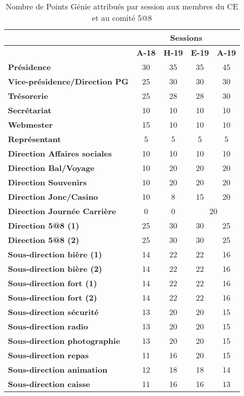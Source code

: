 \begin{table}[H]
    \centering
    \caption{Nombre de Points Génie attribués par session aux membres du CE et au comité 5@8}
    \begin{tabular}{|l|c|c|c|c|}
      \hline
       &\multicolumn{4}{|c|}{\textbf{Sessions}} \\ 
      \hline
       & \textbf{A-18} & \textbf{H-19} & \textbf{E-19} & \textbf{A-19} \\
      \hline
      \textbf{Présidence} & 30 & 35 & 35 & 45 \\
      \hline
      \textbf{Vice-présidence/Direction PG} & 25 & 30 & 30 & 30\\
      \hline
      \textbf{Trésorerie} & 25 & 28 & 28 & 30 \\
      \hline
      \textbf{Secrétariat} & 10 & 10 & 10 & 10 \\
      \hline
      \textbf{Webmester} & 15 & 10 & 10 & 10 \\
      \hline
      \textbf{Représentant} & 5 & 5 & 5 & 5 \\
      \hline
      \textbf{Direction Affaires sociales} & 10 & 10 & 10 & 10 \\
      \hline
      \textbf{Direction Bal/Voyage} & 10 & 20 & 20 & 20 \\
      \hline
      \textbf{Direction Souvenirs} & 10 & 20 & 20 & 20 \\
      \hline
      \textbf{Direction Jonc/Casino} & 10 & 8 & 15 & 20 \\
      \hline
      \textbf{Direction Journée Carrière} & 0 & 0 & \multicolumn{2}{|c|}{20} \\
      \hline
      \textbf{Direction 5@8 (1)} & 25 & 30 & 30 & 25 \\
      \hline
      \textbf{Direction 5@8 (2)} & 25 & 30 & 30 & 25 \\
      \hline
      \textbf{Sous-direction bière (1)} & 14 & 22 & 22 & 16 \\
      \hline
      \textbf{Sous-direction bière (2)} & 14 & 22 & 22 & 16 \\
      \hline
      \textbf{Sous-direction fort (1)} & 14 & 22 & 22 & 16 \\
      \hline
      \textbf{Sous-direction fort (2)} & 14 & 22 & 22 & 16 \\
      \hline
      \textbf{Sous-direction sécurité} & 13 & 20 & 20 & 15 \\
      \hline
      \textbf{Sous-direction radio} & 13 & 20 & 20 & 15 \\
      \hline
      \textbf{Sous-direction photographie} & 13 & 20 & 20 & 15 \\
      \hline
      \textbf{Sous-direction repas} & 11 & 16 & 20 & 15 \\
      \hline
      \textbf{Sous-direction animation} & 12 & 18 & 18 & 14 \\
      \hline
      \textbf{Sous-direction caisse} & 11 & 16 & 16 & 13 \\
      \hline
    \end{tabular}
\end{table}

